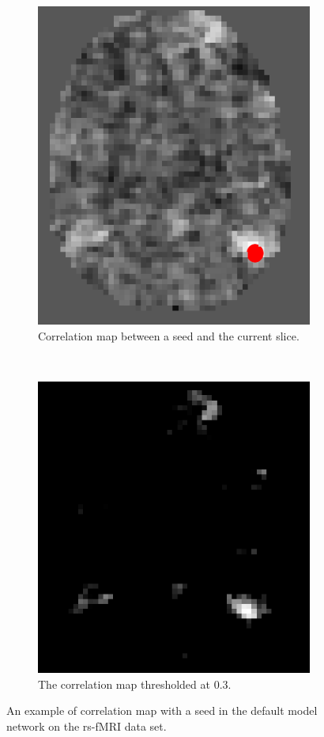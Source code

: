 \begin{figure}[p]
\begin{subfigure}[b]{0.3\textwidth}
    \includegraphics[height=\textwidth]{figures/method1/corrmap}
    \caption{Correlation map between a seed and the current slice.}
    \label{fig:corrmap}
    \end{subfigure}
~
  \begin{subfigure}[b]{0.3\textwidth}
    \centering
    \includegraphics[height=\textwidth]{figures/method1/corrmap_th}
    \caption{The correlation map thresholded at 0.3.}
    \label{fig:corrmap_th}
    \end{subfigure}
  \caption{An example of correlation map with a seed in the default model
    network on the rs-fMRI data set.}
  \label{fig:conexample}
\end{figure}

